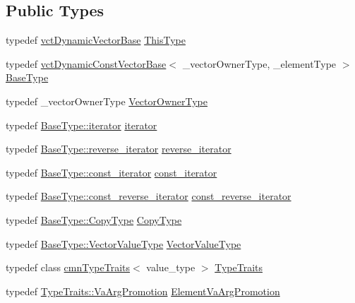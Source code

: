 \subsection*{Public Types}
\begin{DoxyCompactItemize}
\item 
typedef \hyperlink{classvct_dynamic_vector_base}{vct\+Dynamic\+Vector\+Base} \hyperlink{classvct_dynamic_vector_base_ae4c00cc291df57593d6a73c838ae897a}{This\+Type}
\item 
typedef \hyperlink{classvct_dynamic_const_vector_base}{vct\+Dynamic\+Const\+Vector\+Base}$<$ \+\_\+vector\+Owner\+Type, \+\_\+element\+Type $>$ \hyperlink{classvct_dynamic_vector_base_a773a8005371ea8d078a842eff2cb719f}{Base\+Type}
\item 
typedef \+\_\+vector\+Owner\+Type \hyperlink{classvct_dynamic_vector_base_a563d79f5b4dd71f037192fe2961b48eb}{Vector\+Owner\+Type}
\item 
typedef \hyperlink{classvct_dynamic_const_vector_base_aaed13bc31a9ee4971bad765ba5c2c811}{Base\+Type\+::iterator} \hyperlink{classvct_dynamic_vector_base_a5f711892fff6a5b01aa014db476f3084}{iterator}
\item 
typedef \hyperlink{classvct_dynamic_const_vector_base_af10d167259519ceeca9276da3435e193}{Base\+Type\+::reverse\+\_\+iterator} \hyperlink{classvct_dynamic_vector_base_ad569da2c70b9f9468f466f59535d53c7}{reverse\+\_\+iterator}
\item 
typedef \hyperlink{classvct_dynamic_const_vector_base_ad04d1e54698ac5e244d15dfacd0e603c}{Base\+Type\+::const\+\_\+iterator} \hyperlink{classvct_dynamic_vector_base_adf3a8f5fcdecc355b9930fa2166e3fb6}{const\+\_\+iterator}
\item 
typedef \hyperlink{classvct_dynamic_const_vector_base_aadfcc99550b376238b6c793c17d19ca5}{Base\+Type\+::const\+\_\+reverse\+\_\+iterator} \hyperlink{classvct_dynamic_vector_base_a19db937e3f8b2fdc7c7d6e720c2bc9b3}{const\+\_\+reverse\+\_\+iterator}
\item 
typedef \hyperlink{classvct_dynamic_const_vector_base_a010ba1a93ccebf494be5a188f923eb43}{Base\+Type\+::\+Copy\+Type} \hyperlink{classvct_dynamic_vector_base_a62fcc6341849207c5273566d0bce3cf5}{Copy\+Type}
\item 
typedef \hyperlink{classvct_dynamic_const_vector_base_a8ffd0619835fb50d43c07502d231e6c8}{Base\+Type\+::\+Vector\+Value\+Type} \hyperlink{classvct_dynamic_vector_base_ad3db797a792ca2ced6433a42b0fa54d6}{Vector\+Value\+Type}
\item 
typedef class \hyperlink{classcmn_type_traits}{cmn\+Type\+Traits}$<$ value\+\_\+type $>$ \hyperlink{classvct_dynamic_vector_base_ae5ebb885e67454fa18cb8101f1acc8dd}{Type\+Traits}
\item 
typedef \hyperlink{classcmn_type_traits_a824cf785b2d249f59bf5d9f03c6e8049}{Type\+Traits\+::\+Va\+Arg\+Promotion} \hyperlink{classvct_dynamic_vector_base_a74f36531adfd7ec68ac6500176134156}{Element\+Va\+Arg\+Promotion}
\end{DoxyCompactItemize}
